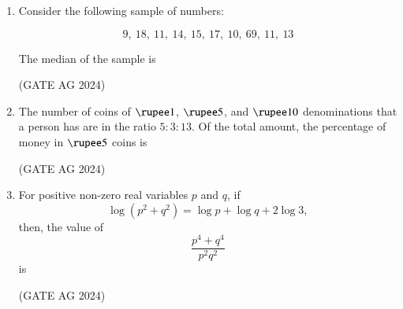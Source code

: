 \documentclass[journal]{IEEEtran}
\begin{document}
\begin{enumerate}
 \medskip


\item 
Consider the following sample of numbers:

\[
9,\ 18,\ 11,\ 14,\ 15,\ 17,\ 10,\ 69,\ 11,\ 13
\]

The median of the sample is

\begin{enumerate}
\end{enumerate}
 \hfill(GATE AG 2024)\\

 \medskip

\item 
The number of coins of $\rupee1$, $\rupee5$, and $\rupee10$ denominations that a person has are in the ratio $5:3:13$. Of the total amount, the percentage of money in $\rupee5$ coins is

\begin{enumerate}
\end{enumerate}
 \hfill(GATE AG 2024)\\

 \medskip

\item
For positive non-zero real variables $p$ and $q$, if
\begin{equation*}
    \log \left( p^2 + q^2 \right) = \log p + \log q + 2\log 3,
\end{equation*}
then, the value of\quad 
\[
\frac{p^4 + q^4}{p^2 q^2}
\]
is
\begin{enumerate}
\end{enumerate}
 \hfill(GATE AG 2024)\\


\end{enumerate}
\end{document}
